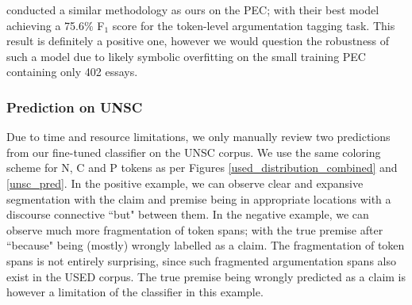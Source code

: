 \citet{eger2017neural} conducted a similar methodology as ours on the PEC; with their best model achieving a 75.6$\%$ F$_1$ score for the token-level argumentation tagging task. This result is definitely a positive one, however we would question the robustness of such a model due to likely symbolic overfitting on the small training PEC containing only 402 essays.

\subsubsection{Prediction on UNSC}
\label{manual_semantic}

Due to time and resource limitations, we only manually review two predictions from our fine-tuned classifier on the UNSC corpus. We use the same coloring scheme for N, C and P tokens as per Figures \ref{used_distribution_combined} and \ref{unsc_pred}. In the positive example, we can observe clear and expansive segmentation with the claim and premise being in appropriate locations with a discourse connective ``but" between them. In the negative example, we can observe much more fragmentation of token spans; with the true premise after ``because" being (mostly) wrongly labelled as a claim. The fragmentation of token spans is not entirely surprising, since such fragmented argumentation spans also exist in the USED corpus. The true premise being wrongly predicted as a claim is however a limitation of the classifier in this example.

